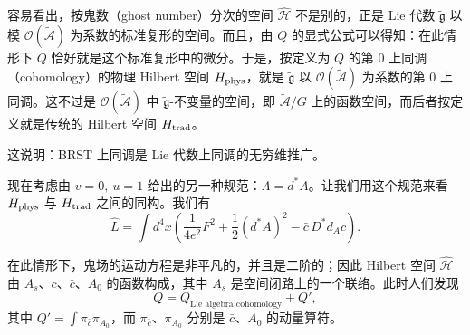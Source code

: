
容易看出，按鬼数（ghost number）分次的空间 $\widehat{\mathcal H}$ 不是别的，正是 Lie 代数 $\tilde{\mathfrak g}$ 以模 $\mathcal O(\widetilde{\mathcal A})$ 为系数的标准复形的空间。而且，由 $Q$ 的显式公式可以得知：在此情形下 $Q$ 恰好就是这个标准复形中的微分。于是，按定义为 $Q$ 的第 0 上同调（cohomology）的物理 Hilbert 空间 $H_{\rm phys}$，就是 $\tilde{\mathfrak g}$ 以 $\mathcal O(\widetilde{\mathcal A})$ 为系数的第 0 上同调。这不过是 $\mathcal O(\widetilde{\mathcal A})$ 中 $\tilde{\mathfrak g}$-不变量的空间，即 $\widetilde{\mathcal A}/G$ 上的函数空间，而后者按定义就是传统的 Hilbert 空间 $H_{\rm trad}$。


这说明：BRST 上同调是 Lie 代数上同调的无穷维推广。

现在考虑由 $v=0,\ u=1$ 给出的另一种规范：$\Lambda=d^{*}A$。让我们用这个规范来看 $H_{\rm phys}$ 与 $H_{\rm trad}$ 之间的同构。我们有
\begin{equation}
  \tag{3.10}
  \label{eq:3-10}
  \widehat L=\int d^4x\left(\frac{1}{4e^2}F^2+\frac{1}{2}(d^{*}A)^2-\bar c\,D^{*}d_Ac\right).
\end{equation}

在此情形下，鬼场的运动方程是非平凡的，并且是二阶的；因此 Hilbert 空间 $\widehat{\mathcal H}$ 由 $A_s$、$c$、$\bar c$、$A_0$ 的函数构成，其中 $A_s$ 是空间闭路上的一个联络。此时人们发现
\begin{equation}
  \tag{3.11}
  \label{eq:3-11}
  Q=Q_{\text{Lie algebra cohomology}}+Q',
\end{equation}
其中 $Q'=\int\pi_{\bar c}\pi_{A_0}$，而 $\pi_{\bar c}$、$\pi_{A_0}$ 分别是 $\bar c$、$A_0$ 的动量算符。

